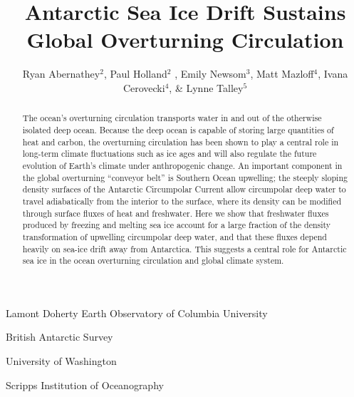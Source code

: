 \documentclass{naturemod}
\title{Antarctic Sea Ice Drift Sustains Global Overturning Circulation}
\author{Ryan Abernathey$^2$, Paul Holland$^2$ , Emily Newsom$^3$,
		Matt Mazloff$^4$, Ivana Cerovecki$^4$, \& Lynne Talley$^5$}
\begin{document}
\maketitle

\begin{affiliations}
 \item Lamont Doherty Earth Observatory of Columbia University
 \item British Antarctic Survey
 \item University of Washington
 \item Scripps Institution of Oceanography
\end{affiliations}

\begin{abstract}
The ocean's overturning circulation transports water in and out of the otherwise isolated deep ocean. Because the deep ocean is capable of storing large quantities of heat and carbon, the overturning circulation has been shown to play a central role in long-term climate fluctuations such as ice ages and will also regulate the future evolution of Earth's climate under anthropogenic change\cite{SarmientoToggweiler1984,SigmanBoyle2000,ToggweilerRussell2008}. An important component in the global overturning ``conveyor belt'' is Southern Ocean upwelling; the steeply sloping density surfaces of the Antarctic Circumpolar Current allow circumpolar deep water to travel adiabatically from the interior to the surface, where its density can be modified through surface fluxes of heat and freshwater\cite{ToggweilerSamuels1995,WolfeCessi2011,NikurashinVallis2012}. Here we show that freshwater fluxes produced by freezing and melting sea ice account for a large fraction of the density transformation of upwelling circumpolar deep water, and that these fluxes depend heavily on sea-ice drift away from Antarctica. This suggests a central role for Antarctic sea ice in the ocean overturning circulation and global climate system.
\end{abstract}



\end{document}
